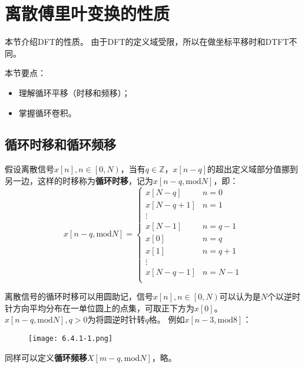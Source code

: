 \section{离散傅里叶变换的性质}

本节介绍DFT的性质。
由于DFT的定义域受限，所以在做坐标平移时和DTFT不同。

本节要点：
\begin{itemize}
    \item 理解循环平移（时移和频移）；
    \item 掌握循环卷积。
\end{itemize}

\subsection{循环时移和循环频移}

\begin{definition}[循环时移]
假设离散信号$x\left[ n \right] ,n\in \left[ 0,N \right) $，当有$q\in \mathbb{Z} $，$x\left[ n-q \right] $的超出定义域部分值挪到另一边，这样的时移称为{\bf 循环时移}，记为$x\left[ n-q,\mathrm{mod}N \right] $，即：
\[
x\left[ n-q,\mathrm{mod}N \right] =\begin{cases}
	x\left[ N-q \right]&		n=0\\
	x\left[ N-q+1 \right]&		n=1\\
	\vdots&		\\
	x\left[ N-1 \right]&		n=q-1\\
	x\left[ 0 \right]&		n=q\\
	x\left[ 1 \right]&		n=q+1\\
	\vdots&		\\
	x\left[ N-q-1 \right]&		n=N-1\\
\end{cases}
\]
\end{definition}

离散信号的循环时移可以用圆助记，信号$x\left[ n \right] ,n\in \left[ 0,N \right) $可以认为是$N$个以逆时针方向平均分布在一单位圆上的点集，可取正下方为$x\left[ 0 \right] $。
$x\left[ n-q,\mathrm{mod}N \right] ,q>0$为将圆逆时针转$q$格。
例如$x\left[ n-3,\mathrm{mod}8 \right] $：
\begin{figure}[h]
\centering
\texttt{[image: 6.4.1-1.png]}
\end{figure}

同样可以定义{\bf 循环频移}$X\left[ m-q,\mathrm{mod}N \right] $，略。

